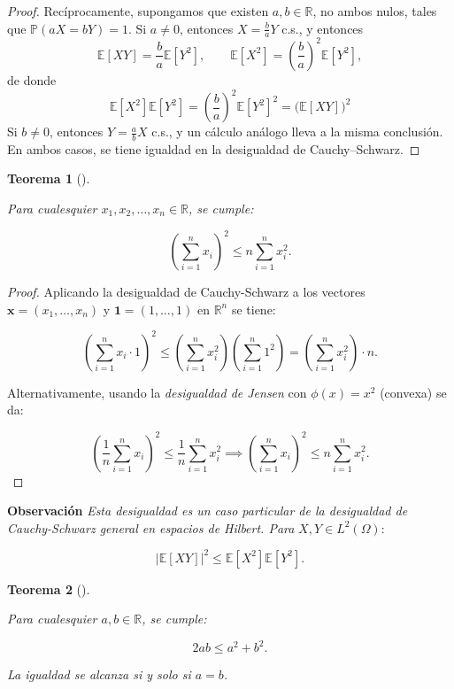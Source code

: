 \documentclass[
  spanish,
  us-letterpaper,
]{scrreprt}
\theoremstyle{plain}
\newtheorem{theorem}{Teorema}[chapter]
\theoremstyle{plain}
\theoremstyle{definition}
\theoremstyle{remark}
\begin{document}
\begin{proof}
Recíprocamente, supongamos que existen \(a, b \in \mathbb{R}\), no ambos
nulos, tales que \(\mathbb{P}(aX = bY) = 1.\) Si \(a \neq 0\), entonces
\(X = \frac{b}{a} Y\) c.s., y entonces
\[\mathbb{E}[XY] = \frac{b}{a} \mathbb{E}[Y^2], \qquad \mathbb{E}[X^2] = \left( \frac{b}{a} \right)^2 \mathbb{E}[Y^2],\]
de donde
\[\mathbb{E}[X^2] \mathbb{E}[Y^2] = \left( \frac{b}{a} \right)^2 \mathbb{E}[Y^2]^2 = \bigl( \mathbb{E}[XY] \bigr)^2\]
Si \(b \neq 0\), entonces \(Y = \frac{a}{b} X\) c.s., y un cálculo
análogo lleva a la misma conclusión. En ambos casos, se tiene igualdad
en la desigualdad de Cauchy--Schwarz.
\end{proof}

\begin{theorem}[]\protect\hypertarget{thm-D_C_S}{}\label{thm-D_C_S}

\emph{Para cualesquier} \(x_1, x_2, \ldots, x_n \in \mathbb{R}\), se
cumple:

\[\left(\sum_{i=1}^n x_i\right)^2 \leq n \sum_{i=1}^n x_i^2.\]

\end{theorem}

\begin{proof}
Aplicando la desigualdad de Cauchy-Schwarz a los vectores
\(\mathbf{x} = (x_1, \ldots, x_n)\) y \(\mathbf{1} = (1, \ldots, 1)\) en
\(\mathbb{R}^n\) se tiene:

\[\left(\sum_{i=1}^n x_i \cdot 1\right)^2 \leq \left(\sum_{i=1}^n x_i^2\right)\left(\sum_{i=1}^n 1^2\right) = \left(\sum_{i=1}^n x_i^2\right) \cdot n.\]

Alternativamente, usando la \emph{desigualdad de Jensen} con
\(\phi(x) = x^2\) (convexa) se da:

\[\left(\frac{1}{n}\sum_{i=1}^n x_i\right)^2 \leq \frac{1}{n}\sum_{i=1}^n x_i^2 \implies \left(\sum_{i=1}^n x_i\right)^2 \leq n \sum_{i=1}^n x_i^2.\]
\end{proof}

\textbf{Observación} \emph{Esta desigualdad es un caso particular de la
desigualdad de Cauchy-Schwarz general en espacios de Hilbert. Para}
\(X, Y \in L^2(\Omega)\):

\[|\mathbb{E}[XY]|^2 \leq \mathbb{E}[X^2]\mathbb{E}[Y^2].\]

\begin{theorem}[]\protect\hypertarget{thm-D_Y_F_S}{}\label{thm-D_Y_F_S}

\emph{Para cualesquier} \(a, b \in \mathbb{R}\), se cumple:

\[2ab \leq a^2 + b^2.\]

\emph{La igualdad se alcanza si y solo si} \(a = b\).

\end{theorem}
\end{document}
